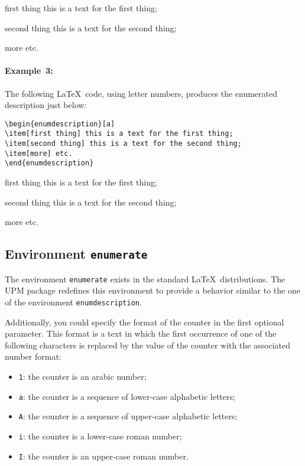 \documentclass[book]{upmethodology-document}
\begin{document}
\begin{enumdescription}[1]
\item[first thing] this is a text for the first thing;
\item[second thing] this is a text for the second thing;
\item[more] etc.
\end{enumdescription}

\paragraph{Example~3:} The following \LaTeX~code, using letter numbers, produces the enumerated description just below:
\begin{verbatim}
\begin{enumdescription}[a]
\item[first thing] this is a text for the first thing;
\item[second thing] this is a text for the second thing;
\item[more] etc.
\end{enumdescription}
\end{verbatim}

\begin{enumdescription}[a]
\item[first thing] this is a text for the first thing;
\item[second thing] this is a text for the second thing;
\item[more] etc.
\end{enumdescription}

\subsection{Environment \texttt{enumerate}}

The environment \texttt{enumerate} exists in the standard \LaTeX\ distributions.
The UPM package redefines this environment to provide a behavior similar to the one of the environment \texttt{enumdescription}.

Additionally, you could specify the format of the counter in the first optional parameter. This format is a text in which the first occurrence of one of the following characters is replaced by the value of the counter with the associated number format:
\begin{itemize}
\item \texttt{1}: the counter is an arabic number;
\item \texttt{a}: the counter is a sequence of lower-case alphabetic letters;
\item \texttt{A}: the counter is a sequence of upper-case alphabetic letters;
\item \texttt{i}: the counter is a lower-case roman number;
\item \texttt{I}: the counter is an upper-case roman number.
\end{itemize}
\end{document}
